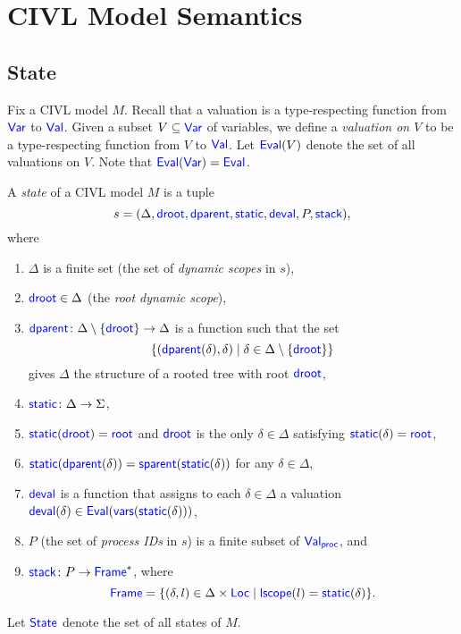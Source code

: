 \documentclass[11pt, oneside, letterpaper]{book}
\begin{document}
\chapter{CIVL Model Semantics}
\label{sec:semantics}

\section{State}
\label{sec:state}

Fix a CIVL model $M$.  Recall that a valuation is a type-respecting
function from $\Var$ to $\Val$.  Given a subset $V\subseteq\Var$ of
variables, we define a \emph{valuation on $V$} to be a type-respecting
function from $V$ to $\Val$.  Let $\Eval(V)$ denote the set of all
valuations on $V$.  Note that $\Eval(\Var)=\Eval$.

\begin{definition}
  \label{def:state}
  A \emph{state} of a CIVL model $M$ is a tuple 
  \[
  s=(\Delta, \droot, \dparent, \static, \deval, P, \stack),
  \]
  where
  \begin{enumerate}
  \item $\Delta$ is a finite set (the set of \emph{dynamic scopes} in
    $s$),
  \item $\droot\in\Delta$ (the \emph{root dynamic scope}),
  \item $\dparent\colon \Delta\setminus\{\droot\}\ra\Delta$
    is a function such that the set 
    \[
    \{(\dparent(\delta),\delta)\mid \delta\in
    \Delta\setminus\{\droot\}\}
    \]
    gives $\Delta$ the structure of a rooted tree with root $\droot$,
    \item $\static\colon\Delta\ra\Sigma$,
  \item $\static(\droot)=\rootscope$ and $\droot$ is the only
    $\delta\in\Delta$ satisfying $\static(\delta)=\rootscope$,
  \item $\static(\dparent(\delta))=\sparent(\static(\delta))$ for any
    $\delta\in\Delta$,
  \item $\deval$ is a function that assigns to each $\delta\in\Delta$
    a valuation $\deval(\delta)\in\Eval(\vars(\static(\delta)))$,
  \item $P$ (the set of \emph{process IDs} in $s$) 
    is a finite subset of $\Val_{\proc}$, and
  \item $\stack\colon P\ra \Frame^*$, where
    \[
    \Frame=\{(\delta,l)\in\Delta\times\Loc\mid\lscope(l)=\static(\delta)\}.
    \]
  \end{enumerate}
  Let $\State$ denote the set of all states of $M$.
\end{definition}
\end{document}

